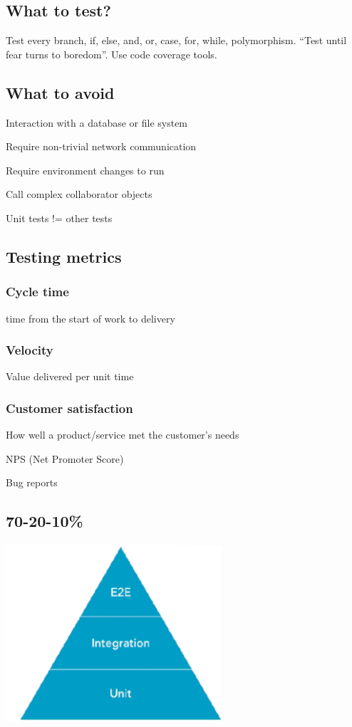 \documentclass[a4paper,14pt, twocolumn]{extarticle}
\begin{document}
		\subsection{What to test?}
			Test every branch, if, else, and, or, case, for, while, polymorphism. “Test until fear turns to boredom”. Use code coverage tools.
		\subsection{What to avoid}
			\begin{compactitem}
				\item Interaction with a database or file system 
				\item Require non-trivial network communication 
				\item Require environment changes to run 
				\item Call complex collaborator objects 
				\item Unit tests != other tests 
			\end{compactitem}
		
		\subsection{Testing metrics}
			\subsubsection{Cycle time}
				time from the start of work to delivery 
			\subsubsection{Velocity}
				Value delivered per unit time 
			\subsubsection{Customer satisfaction }
				How well a product/service met the customer’s needs	
				\begin{compactitem}
					\item NPS (Net Promoter Score) 
					\item Bug reports
				\end{compactitem}
			\twocolumn
		\subsection{70-20-10\%}
			\begin{center}
				\includegraphics[width=8cm]{pi}
			\end{center}
\end{document}
